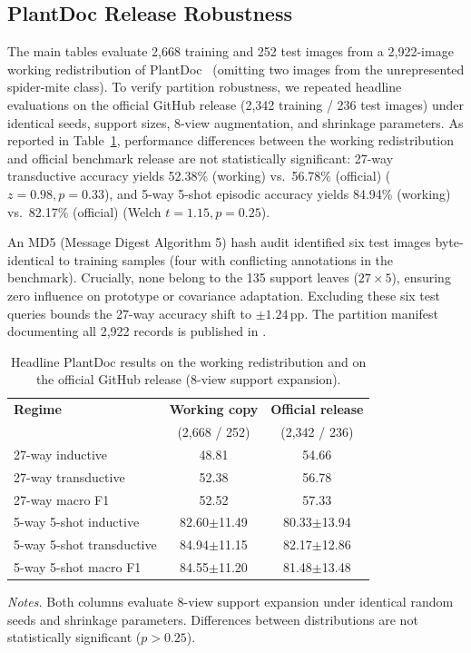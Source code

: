 \documentclass[preprint,12pt]{elsarticle}
\begin{document}
\subsection{PlantDoc Release Robustness}
\label{app:plantdoc_official}
The main tables evaluate 2{,}668 training and 252 test images from a 2{,}922-image working redistribution of PlantDoc~\cite{singh2020plantdoc} (omitting two images from the unrepresented spider-mite class). To verify partition robustness, we repeated headline evaluations on the official GitHub release (2{,}342 training / 236 test images) under identical seeds, support sizes, 8-view augmentation, and shrinkage parameters. As reported in Table~\ref{tab:plantdoc_official}, performance differences between the working redistribution and official benchmark release are not statistically significant: 27-way transductive accuracy yields 52.38\% (working) vs.\ 56.78\% (official) ($z=0.98, p=0.33$), and 5-way 5-shot episodic accuracy yields 84.94\% (working) vs.\ 82.17\% (official) (Welch $t=1.15, p=0.25$).

An MD5 (Message Digest Algorithm 5) hash audit identified six test images byte-identical to training samples (four with conflicting annotations in the benchmark). Crucially, none belong to the 135 support leaves ($27 \times 5$), ensuring zero influence on prototype or covariance adaptation. Excluding these six test queries bounds the 27-way accuracy shift to $\pm1.24$\,pp. The partition manifest documenting all 2{,}922 records is published in .

\begin{table}[htbp]
\caption{Headline PlantDoc results on the working redistribution and on the official GitHub release (8-view support expansion).}
\label{tab:plantdoc_official}
\centering
\footnotesize
\setlength{\tabcolsep}{4pt}
\begin{tabular*}{\columnwidth}{@{\extracolsep{\fill}}lcc}
\toprule
\textbf{Regime} & \textbf{Working copy} & \textbf{Official release} \\
 & (2{,}668 / 252) & (2{,}342 / 236) \\
\midrule
27-way inductive & 48.81 & 54.66 \\
27-way transductive & 52.38 & 56.78 \\
27-way macro F1 & 52.52 & 57.33 \\
5-way 5-shot inductive & 82.60$\pm$11.49 & 80.33$\pm$13.94 \\
5-way 5-shot transductive & 84.94$\pm$11.15 & 82.17$\pm$12.86 \\
5-way 5-shot macro F1 & 84.55$\pm$11.20 & 81.48$\pm$13.48 \\
\bottomrule
\end{tabular*}

\vspace{3pt}
\begin{minipage}{\columnwidth}
\footnotesize
\textit{Notes.} Both columns evaluate 8-view support expansion under identical random seeds and shrinkage parameters. Differences between distributions are not statistically significant ($p > 0.25$).
\end{minipage}
\end{table}
\end{document}
